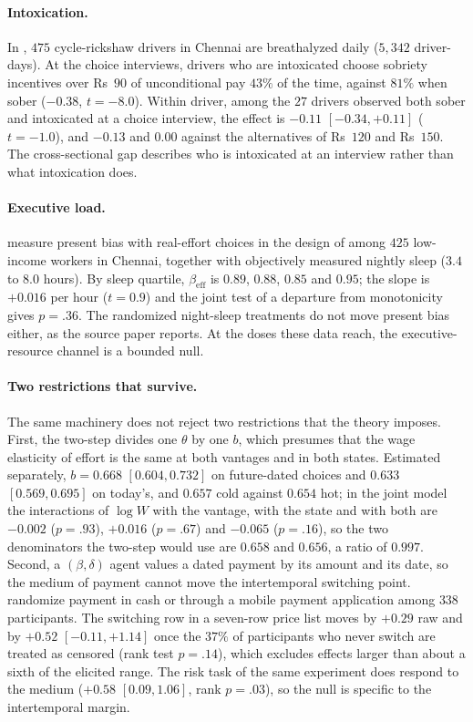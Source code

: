 \documentclass[11pt,a4paper]{article}
\theoremstyle{plain}
\theoremstyle{definition}
\newcommand{\beff}{\beta_{\mathrm{eff}}}
\begin{document}
\paragraph{Intoxication.} In \citet{schilbach2019}, $475$ cycle-rickshaw drivers in Chennai are breathalyzed daily
($5{,}342$ driver-days). At the choice interviews, drivers who are intoxicated choose sobriety incentives over
Rs~$90$ of unconditional pay $43\%$ of the time, against $81\%$ when sober ($-0.38$, $t=-8.0$). Within driver, among
the $27$ drivers observed both sober and intoxicated at a choice interview, the effect is $-0.11$ $[-0.34,+0.11]$
($t=-1.0$), and $-0.13$ and $0.00$ against the alternatives of Rs~$120$ and Rs~$150$. The cross-sectional gap
describes who is intoxicated at an interview rather than what intoxication does.

\paragraph{Executive load.} \citet{bessone2021} measure present bias with real-effort choices in the design of
\citet{augenblick2019} among $425$ low-income workers in Chennai, together with objectively measured nightly sleep
($3.4$ to $8.0$ hours). By sleep quartile, $\beff$ is $0.89$, $0.88$, $0.85$ and $0.95$; the slope is $+0.016$ per
hour ($t=0.9$) and the joint test of a departure from monotonicity gives $p=.36$. The randomized night-sleep treatments
do not move present bias either, as the source paper reports. At the doses these data reach, the executive-resource
channel is a bounded null.

\paragraph{Two restrictions that survive.} The same machinery does not reject two restrictions that the theory
imposes. First, the two-step divides one $\theta$ by one $b$, which presumes that the wage elasticity of effort is
the same at both vantages and in both states. Estimated separately, $b=0.668$ $[0.604,0.732]$ on future-dated choices
and $0.633$ $[0.569,0.695]$ on today's, and $0.657$ cold against $0.654$ hot; in the joint model the interactions of
$\log W$ with the vantage, with the state and with both are $-0.002$ ($p=.93$), $+0.016$ ($p=.67$) and $-0.065$
($p=.16$), so the two denominators the two-step would use are $0.658$ and $0.656$, a ratio of $0.997$. Second, a
$(\beta,\delta)$ agent values a dated payment by its amount and its date, so the medium of payment cannot move the
intertemporal switching point. \citet{hoel2022} randomize payment in cash or through a mobile payment application
among $338$ participants. The switching row in a seven-row price list moves by $+0.29$ raw and by $+0.52$
$[-0.11,+1.14]$ once the $37\%$ of participants who never switch are treated as censored (rank test $p=.14$), which
excludes effects larger than about a sixth of the elicited range. The risk task of the same experiment does respond
to the medium ($+0.58$ $[0.09,1.06]$, rank $p=.03$), so the null is specific to the intertemporal margin.
\end{document}
